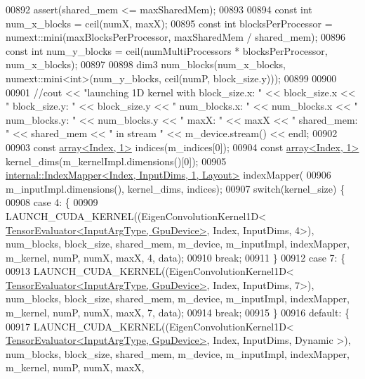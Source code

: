 \begin{DoxyCode}
00892         assert(shared\_mem <= maxSharedMem);
00893 
00894         \textcolor{keyword}{const} \textcolor{keywordtype}{int} num\_x\_blocks = ceil(numX, maxX);
00895         \textcolor{keyword}{const} \textcolor{keywordtype}{int} blocksPerProcessor = numext::mini(maxBlocksPerProcessor, maxSharedMem / shared\_mem);
00896         \textcolor{keyword}{const} \textcolor{keywordtype}{int} num\_y\_blocks = ceil(numMultiProcessors * blocksPerProcessor, num\_x\_blocks);
00897 
00898         dim3 num\_blocks(num\_x\_blocks, numext::mini<int>(num\_y\_blocks, ceil(numP, block\_size.y)));
00899 
00900 
00901         \textcolor{comment}{//cout << "launching 1D kernel with block\_size.x: " << block\_size.x << " block\_size.y: " <<
       block\_size.y << " num\_blocks.x: " << num\_blocks.x << " num\_blocks.y: " << num\_blocks.y << " maxX: " << maxX << "
       shared\_mem: " << shared\_mem << " in stream " << m\_device.stream() << endl;}
00902 
00903         \textcolor{keyword}{const} \hyperlink{class_eigen_1_1array}{array<Index, 1>} indices(m\_indices[0]);
00904         \textcolor{keyword}{const} \hyperlink{class_eigen_1_1array}{array<Index, 1>} kernel\_dims(m\_kernelImpl.dimensions()[0]);
00905         \hyperlink{class_eigen_1_1internal_1_1_index_mapper}{internal::IndexMapper<Index, InputDims, 1, Layout>}
       indexMapper(
00906             m\_inputImpl.dimensions(), kernel\_dims, indices);
00907         \textcolor{keywordflow}{switch}(kernel\_size) \{
00908           \textcolor{keywordflow}{case} 4: \{
00909             LAUNCH\_CUDA\_KERNEL((EigenConvolutionKernel1D<
      \hyperlink{struct_eigen_1_1_tensor_evaluator}{TensorEvaluator<InputArgType, GpuDevice>}, Index, InputDims, 4>), 
      num\_blocks, block\_size, shared\_mem, m\_device, m\_inputImpl, indexMapper, m\_kernel, numP, numX, maxX, 4, data);
00910             \textcolor{keywordflow}{break};
00911           \}
00912           \textcolor{keywordflow}{case} 7: \{
00913             LAUNCH\_CUDA\_KERNEL((EigenConvolutionKernel1D<
      \hyperlink{struct_eigen_1_1_tensor_evaluator}{TensorEvaluator<InputArgType, GpuDevice>}, Index, InputDims, 7>), 
      num\_blocks, block\_size, shared\_mem, m\_device, m\_inputImpl, indexMapper, m\_kernel, numP, numX, maxX, 7, data);
00914             \textcolor{keywordflow}{break};
00915           \}
00916           \textcolor{keywordflow}{default}: \{
00917             LAUNCH\_CUDA\_KERNEL((EigenConvolutionKernel1D<
      \hyperlink{struct_eigen_1_1_tensor_evaluator}{TensorEvaluator<InputArgType, GpuDevice>}, Index, InputDims, Dynamic
      >), num\_blocks, block\_size, shared\_mem, m\_device, m\_inputImpl, indexMapper, m\_kernel, numP, numX, maxX, 

\end{DoxyCode}
